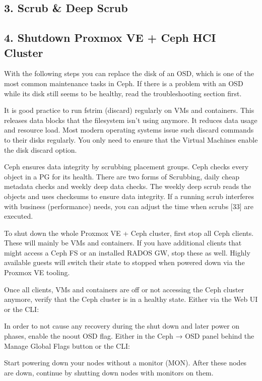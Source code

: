 \subsection{3. Scrub & Deep Scrub}

\subsection{4. Shutdown Proxmox VE + Ceph HCI Cluster}

With the following steps you can replace the disk of an OSD, which is one of the most common maintenance tasks in Ceph. If there is a problem with an OSD while its disk still seems to be healthy, read the troubleshooting section first.

It is good practice to run fstrim (discard) regularly on VMs and containers. This releases data blocks that the filesystem isn’t using anymore. It reduces data usage and resource load. Most modern operating systems issue such discard commands to their disks regularly. You only need to ensure that the Virtual Machines enable the disk discard option.

Ceph ensures data integrity by scrubbing placement groups. Ceph checks every object in a PG for its health. There are two forms of Scrubbing, daily cheap metadata checks and weekly deep data checks. The weekly deep scrub reads the objects and uses checksums to ensure data integrity. If a running scrub interferes with business (performance) needs, you can adjust the time when scrubs [33] are executed.

To shut down the whole Proxmox VE + Ceph cluster, first stop all Ceph clients. These will mainly be VMs and containers. If you have additional clients that might access a Ceph FS or an installed RADOS GW, stop these as well. Highly available guests will switch their state to stopped when powered down via the Proxmox VE tooling.

Once all clients, VMs and containers are off or not accessing the Ceph cluster anymore, verify that the Ceph cluster is in a healthy state. Either via the Web UI or the CLI:

In order to not cause any recovery during the shut down and later power on phases, enable the noout OSD flag. Either in the Ceph → OSD panel behind the Manage Global Flags button or the CLI:

Start powering down your nodes without a monitor (MON). After these nodes are down, continue by shutting down nodes with monitors on them.

